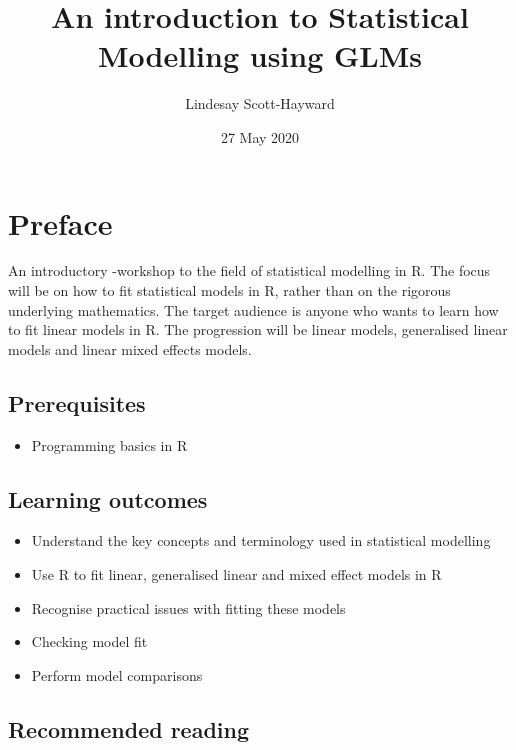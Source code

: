 \documentclass[
]{book}
\title{An introduction to Statistical Modelling using GLMs}
\author{Lindesay Scott-Hayward}
\date{27 May 2020}
\providecommand{\tightlist}{%
  \setlength{\itemsep}{0pt}\setlength{\parskip}{0pt}}
\theoremstyle{definition}
\theoremstyle{definition}
\theoremstyle{definition}
\theoremstyle{remark}
\begin{document}
\maketitle

{
\setcounter{tocdepth}{1}
\tableofcontents
}
\hypertarget{preface}{%
\chapter*{Preface}\label{preface}}

An introductory -workshop to the field of statistical modelling in R. The focus will be on how to fit statistical models in R, rather than on the rigorous underlying mathematics. The target audience is anyone who wants to learn how to fit linear models in R. The progression will be linear models, generalised linear models and linear mixed effects models.

\hypertarget{prerequisites}{%
\section*{Prerequisites}\label{prerequisites}}

\begin{itemize}
\tightlist
\item
  Programming basics in R
\end{itemize}

\hypertarget{learning-outcomes}{%
\section*{Learning outcomes}\label{learning-outcomes}}

\begin{itemize}
\tightlist
\item
  Understand the key concepts and terminology used in statistical modelling
\item
  Use R to fit linear, generalised linear and mixed effect models in R
\item
  Recognise practical issues with fitting these models
\item
  Checking model fit
\item
  Perform model comparisons
\end{itemize}

\hypertarget{recommended-reading}{%
\section*{Recommended reading}\label{recommended-reading}}
\end{document}
